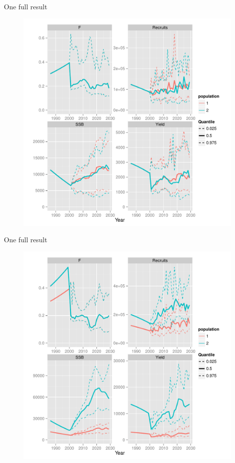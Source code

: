 \documentclass{beamer}
\begin{document}

\begin{withoutheadline}
\begin{frame}{One full result}
  \begin{figure}
  \flushright
  \includegraphics[width=.7\textwidth]{full-result1}
  \end{figure}
\end{frame}
\end{withoutheadline}

\begin{withoutheadline}
\begin{frame}{One full result}
  \begin{figure}
  \flushleft
  \includegraphics[width=.7\textwidth]{full-result2}
  \end{figure}
\end{frame}
\end{withoutheadline}
\end{document}
